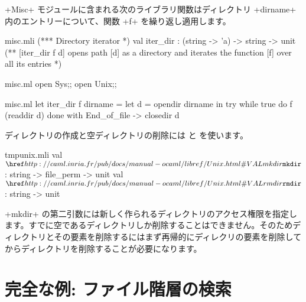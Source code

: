 \begin{example}
\ml+Misc+ モジュールに含まれる次のライブラリ関数はディレクトリ \ml+dirname+ 内のエントリーについて、関数 \ml+f+ を繰り返し適用します。
%
\begin{codefile}{misc.mli}
(*** Directory iterator *)
val iter_dir : (string -> 'a) -> string -> unit
(** [iter_dir f d] opens path [d] as a directory and iterates the
function [f] over all its entries *)
\end{codefile}
%
\begin{codefile}{misc.ml}
open Sys;;
open Unix;;
\end{codefile}
%
\begin{listingcodefile}{misc.ml}
let iter_dir f dirname =
  let d = opendir dirname in
  try while true do f (readdir d) done
  with End_of_file -> closedir d
\end{listingcodefile}
\end{example}

ディレクトリの作成と空ディレクトリの削除には  と  を使います。
%
\begin{listingcodefile}{tmpunix.mli}
val $\libvalue{Unix}{mkdir}$ : string -> file_perm -> unit
val $\libvalue{Unix}{rmdir}$ : string -> unit
\end{listingcodefile}
%
\ml+mkdir+ の第二引数には新しく作られるディレクトリのアクセス権限を指定します。すでに空であるディレクトリしか削除することはできません。そのためディレクトリとその要素を削除するにはまず再帰的にディレクリの要素を削除してからディレクトリを削除することが必要になります。

\section{\label{ex/find}完全な例: ファイル階層の検索}

